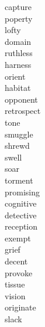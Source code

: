 \documentclass[a4paper, 10pt]{ctexart}
\begin{document}
\begin{multicols*}{2}
\begin{description}
\item[capture]

\item[poperty]

\item[lofty]

\item[domain]

\item[ruthless]

\item[harness]

\item[orient]

\item[habitat]

\item[opponent]

\item[retrospect]

\item[tone]

\item[smuggle]

\item[shrewd]

\item[swell]

\item[soar]

\item[torment]

\item[promising]

\item[cognitive]

\item[detective]

\item[reception]

\item[exempt]

\item[grief]

\item[decent]

\item[provoke]

\item[tissue]

\item[vision]

\item[originate]

\item[slack]


\end{description}
\end{multicols*}
\end{document}
